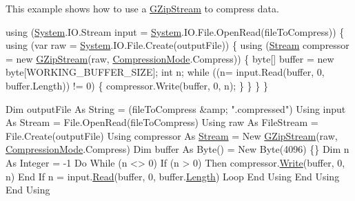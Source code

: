 This example shows how to use a \mbox{\hyperlink{class_super_tiled2_unity_1_1_ionic_1_1_zlib_1_1_g_zip_stream}{G\+Zip\+Stream}} to compress data. 
\begin{DoxyCode}
\textcolor{keyword}{using} (\mbox{\hyperlink{namespace_system}{System}}.IO.Stream input = \mbox{\hyperlink{namespace_system}{System}}.IO.File.OpenRead(fileToCompress))
\{
    \textcolor{keyword}{using} (var raw = \mbox{\hyperlink{namespace_system}{System}}.IO.File.Create(outputFile))
    \{
        \textcolor{keyword}{using} (\mbox{\hyperlink{namespace_super_tiled2_unity_1_1_ionic_1_1_zip_a9ced5352c56e7e0fceff15b534073c83aeae835e83c0494a376229f254f7d3392}{Stream}} compressor = \textcolor{keyword}{new} \mbox{\hyperlink{class_super_tiled2_unity_1_1_ionic_1_1_zlib_1_1_g_zip_stream_a509b4683754c1e03e277c5688b75cf54}{GZipStream}}(raw, 
      \mbox{\hyperlink{namespace_super_tiled2_unity_1_1_ionic_1_1_zlib_ad5b7635d92497e1c905e5de82eb1c6b1}{CompressionMode}}.Compress))
        \{
            byte[] buffer = \textcolor{keyword}{new} byte[WORKING\_BUFFER\_SIZE];
            \textcolor{keywordtype}{int} n;
            \textcolor{keywordflow}{while} ((n= input.Read(buffer, 0, buffer.Length)) != 0)
            \{
                compressor.Write(buffer, 0, n);
            \}
        \}
    \}
\}
\end{DoxyCode}
 
\begin{DoxyCode}
Dim outputFile As String = (fileToCompress &amp; \textcolor{stringliteral}{".compressed"})
Using input As Stream = File.OpenRead(fileToCompress)
    Using raw As FileStream = File.Create(outputFile)
    Using compressor As \mbox{\hyperlink{namespace_super_tiled2_unity_1_1_ionic_1_1_zip_a9ced5352c56e7e0fceff15b534073c83aeae835e83c0494a376229f254f7d3392}{Stream}} = New \mbox{\hyperlink{class_super_tiled2_unity_1_1_ionic_1_1_zlib_1_1_g_zip_stream_a509b4683754c1e03e277c5688b75cf54}{GZipStream}}(raw, 
      \mbox{\hyperlink{namespace_super_tiled2_unity_1_1_ionic_1_1_zlib_ad5b7635d92497e1c905e5de82eb1c6b1}{CompressionMode}}.Compress)
        Dim buffer As Byte() = New Byte(4096) \{\}
        Dim n As Integer = -1
        Do While (n <> 0)
            If (n > 0) Then
                compressor.\mbox{\hyperlink{class_super_tiled2_unity_1_1_ionic_1_1_zlib_1_1_g_zip_stream_a49032afb5806563236a5d53841abe2b8}{Write}}(buffer, 0, n)
            End If
            n = input.\mbox{\hyperlink{class_super_tiled2_unity_1_1_ionic_1_1_zlib_1_1_g_zip_stream_a772b5013a585850ffaf8be4aa7f3dbcf}{Read}}(buffer, 0, buffer.\mbox{\hyperlink{class_super_tiled2_unity_1_1_ionic_1_1_zlib_1_1_g_zip_stream_ade637ab4f778c5ee7f5540e00662a645}{Length}})
        Loop
    End Using
    End Using
End Using
\end{DoxyCode}
 

